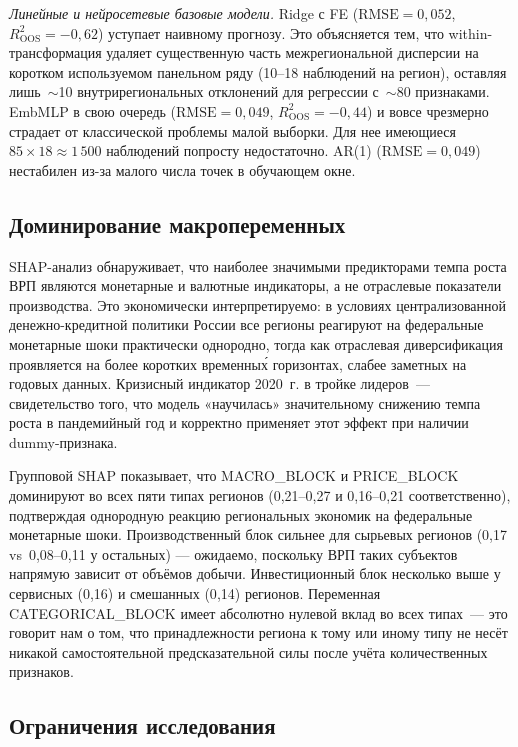 \documentclass[12pt,a4paper]{article}
\begin{document}
\textit{Линейные и нейросетевые базовые модели.} Ridge с FE
($\mathrm{RMSE}=0{,}052$, $R^2_{\mathrm{OOS}}=-0{,}62$) уступает
наивному прогнозу. Это объясняется тем, что within-трансформация удаляет существенную часть
межрегиональной дисперсии на коротком используемом панельном ряду (10--18 наблюдений
на регион), оставляя лишь~$\sim$10 внутрирегиональных отклонений для
регрессии с~$\sim$80 признаками. EmbMLP в свою очередь ($\mathrm{RMSE}=0{,}049$,
$R^2_{\mathrm{OOS}}=-0{,}44$) и вовсе чрезмерно страдает от классической проблемы малой
выборки. Для нее имеющиеся $85 \times 18 \approx 1\,500$ наблюдений попросту недостаточно. AR(1) ($\mathrm{RMSE}=0{,}049$) нестабилен
из-за малого числа точек в обучающем окне.

\subsection{Доминирование макропеременных}

SHAP-анализ обнаруживает, что наиболее значимыми предикторами темпа роста
ВРП являются монетарные и валютные индикаторы, а не отраслевые показатели
производства. Это экономически интерпретируемо: в условиях централизованной
денежно-кредитной политики России все регионы реагируют на федеральные
монетарные шоки практически однородно, тогда как отраслевая диверсификация
проявляется на более коротких временны\'{х} горизонтах, слабее заметных на
годовых данных. Кризисный индикатор 2020~г. в тройке лидеров~---
свидетельство того, что модель «научилась» значительному снижению темпа
роста в пандемийный год и корректно применяет этот эффект при наличии
dummy-признака.

Групповой SHAP показывает, что MACRO\_BLOCK и PRICE\_BLOCK доминируют
во всех пяти типах регионов (0{,}21--0{,}27 и 0{,}16--0{,}21
соответственно), подтверждая однородную реакцию региональных экономик
на федеральные монетарные шоки. Производственный блок сильнее для
сырьевых регионов (0{,}17 vs~0{,}08--0{,}11 у остальных) --- ожидаемо,
поскольку ВРП таких субъектов напрямую зависит от объёмов добычи.
Инвестиционный блок несколько выше у сервисных (0{,}16) и смешанных
(0{,}14) регионов. Переменная CATEGORICAL\_BLOCK имеет абсолютно нулевой вклад во всех
типах~--- это говорит нам о том, что принадлежности региона к тому или иному типу
не несёт никакой самостоятельной предсказательной силы после учёта
количественных признаков.

\subsection{Ограничения исследования}
\end{document}

